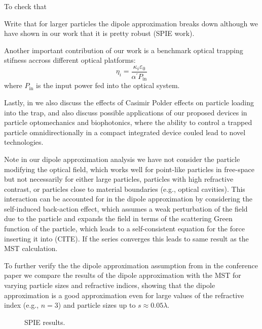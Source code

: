 To check that 


Write that for larger particles the dipole approximation breaks down
although we have shown in our work that it is pretty robust (SPIE work).

Another important contribution of our work is a benchmark optical trapping stifness accross different
optical platforms:
\begin{equation}
    \eta_i=\frac{\kappa_i \varepsilon_0}{\alpha^\prime P_{\text{in}}}
\end{equation}
where $P_{\text{in}}$ is the input power fed into the optical system. 


Lastly, in \cite{ownpub2} we also discuss the effects of Casimir Polder effects on particle loading into the trap, and
also discuss possible applications of our proposed devices in particle optomechanics and
biophotonics, where the ability to control a trapped particle omnidirectionally in a compact integrated device
couled lead to novel technologies.


Note in our dipole approximation analysis we have not consider the particle modifying
the optical field, which works well for point-like particles in free-space but not necessarily 
for either large particles, particles with high refractive contrast, or particles close to material
boundaries (e.g., optical cavities). This interaction can be accounted for in the dipole
approximation by considering the self-induced back-action effect, which assumes a weak
perturbation of the field due to the particle and expands the field in terms of 
the scattering Green function of the particle, which leads to a self-consistent
equation for the force inserting it into (CITE). If the series converges this leads 
to same result as the MST calculation. 

To further verify the the dipole approximation assumption from \cite{ownpub2} in the 
conference paper \cite{ownpub3} we compare the results of the dipole approximation with the MST
for varying particle sizes and refractive indices, showing that the dipole approximation is a good approximation
even for large values of the refractive index (e.g., $n=3$) and particle sizes up to $s\approx 0.05 \lambda$. 

\begin{figure}[tb]
    \centering
    \caption{SPIE results.}
    \label{fig:SPIE}
\end{figure}

